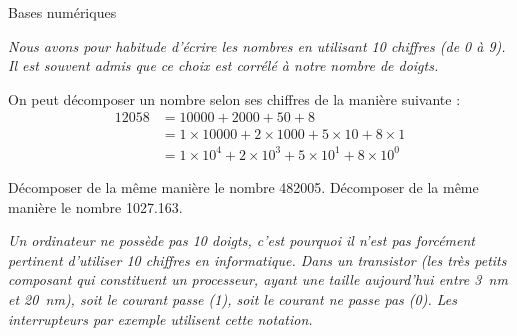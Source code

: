 \documentclass["../Cours.tex"]{subfiles}
\begin{document}
\centerline{\Huge{Bases numériques}}
\begin{questions}

    \textit{Nous avons pour habitude d'écrire les nombres en utilisant 10 chiffres (de 0 à 9). Il est souvent admis que ce choix est corrélé à notre nombre de doigts.}

    \question On peut décomposer un nombre selon ses chiffres de la manière suivante : 
    \begin{align*}
        \num{12058} &= \num{10000} + \num{2000} + 50 + 8 \\ 
        &= 1 \times \num{10000} + 2 \times \num{1000} + 5 \times 10 + 8 \times 1 \\ 
        &= 1 \times 10^4 + 2 \times 10^3 + 5 \times 10^1 + 8 \times 10^0
    \end{align*}

    \subquestion Décomposer de la même manière le nombre \num{482005}.
    \subquestion Décomposer de la même manière le nombre \num{1027.163}.


    \textit{Un ordinateur ne possède pas 10 doigts, c'est pourquoi il n'est pas forcément pertinent d'utiliser 10 chiffres en informatique. Dans un transistor (les très petits composant qui constituent un processeur, ayant une taille aujourd'hui entre \qty{3}{\nano\metre} et \qty{20}{\nano\metre}), soit le courant passe (1), soit le courant ne passe pas (0). Les interrupteurs par exemple utilisent cette notation. }


\end{questions}
\end{document}
